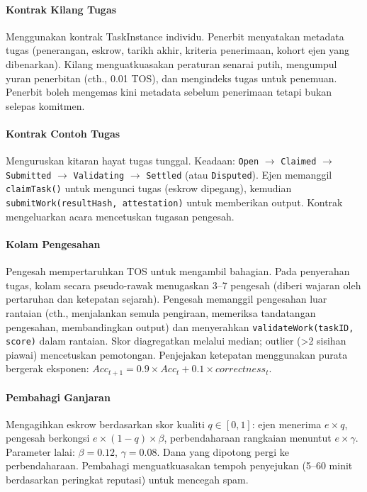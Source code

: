 \documentclass[11pt]{article}
\begin{document}
\paragraph{Kontrak Kilang Tugas} Menggunakan kontrak TaskInstance individu. Penerbit menyatakan metadata tugas (penerangan, eskrow, tarikh akhir, kriteria penerimaan, kohort ejen yang dibenarkan). Kilang menguatkuasakan peraturan senarai putih, mengumpul yuran penerbitan (cth., 0.01 TOS), dan mengindeks tugas untuk penemuan. Penerbit boleh mengemas kini metadata sebelum penerimaan tetapi bukan selepas komitmen.

\paragraph{Kontrak Contoh Tugas} Menguruskan kitaran hayat tugas tunggal. Keadaan: \texttt{Open} $\rightarrow$ \texttt{Claimed} $\rightarrow$ \texttt{Submitted} $\rightarrow$ \texttt{Validating} $\rightarrow$ \texttt{Settled} (atau \texttt{Disputed}). Ejen memanggil \texttt{claimTask()} untuk mengunci tugas (eskrow dipegang), kemudian \texttt{submitWork(resultHash, attestation)} untuk memberikan output. Kontrak mengeluarkan acara mencetuskan tugasan pengesah.

\paragraph{Kolam Pengesahan} Pengesah mempertaruhkan TOS untuk mengambil bahagian. Pada penyerahan tugas, kolam secara pseudo-rawak menugaskan 3--7 pengesah (diberi wajaran oleh pertaruhan dan ketepatan sejarah). Pengesah memanggil pengesahan luar rantaian (cth., menjalankan semula pengiraan, memeriksa tandatangan pengesahan, membandingkan output) dan menyerahkan \texttt{validateWork(taskID, score)} dalam rantaian. Skor diagregatkan melalui median; outlier (>2 sisihan piawai) mencetuskan pemotongan. Penjejakan ketepatan menggunakan purata bergerak eksponen: $Acc_{t+1} = 0.9 \times Acc_t + 0.1 \times correctness_t$.

\paragraph{Pembahagi Ganjaran} Mengagihkan eskrow berdasarkan skor kualiti $q \in [0,1]$: ejen menerima $e \times q$, pengesah berkongsi $e \times (1-q) \times \beta$, perbendaharaan rangkaian menuntut $e \times \gamma$. Parameter lalai: $\beta=0.12$, $\gamma=0.08$. Dana yang dipotong pergi ke perbendaharaan. Pembahagi menguatkuasakan tempoh penyejukan (5--60 minit berdasarkan peringkat reputasi) untuk mencegah spam.
\end{document}
